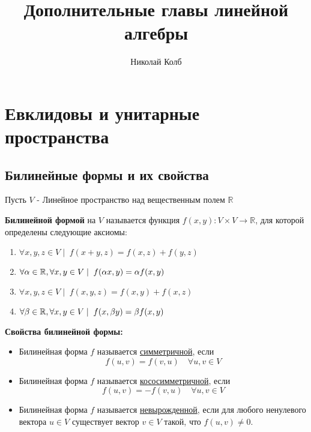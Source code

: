 \documentclass[12px]{report}
\title{Дополнительные главы линейной алгебры}
\author{Николай Колб}
\begin{document}
  \maketitle
  \tableofcontents

  \chapter{Евклидовы и унитарные пространства}

  \section{Билинейные формы и их свойства}

\large Пусть $V$ - Линейное пространство над вещественным полем $\mathbb{R}$

\vspace{0.5cm}


\begin{shdef}
    \begin{definition}
        \leavevmode\newline
        
        \textbf{Билинейной формой} на $V$ называется функция $f(x,y): V \times V \to \mathbb{R}$, для которой определены следующие аксиомы:
        \begin{enumerate}
            \item $\forall x,y,z \in V \mid \; f(x+y,z) = f(x, z) + f(y,z)$
            \item $\forall \alpha \in \mathbb{R}, \forall x,y \in V \mid \;  f(\alpha x, y) = \alpha f(x,y)$
            \item $\forall x, y, z \in V \mid \; f(x,y,z) = f(x,y) + f(x,z)$
            \item $\forall \beta \in \mathbb{R}, \forall x, y \in V \mid \; f(x, \beta y) = \beta f(x,y)$
        \end{enumerate}
    \end{definition}
\end{shdef}

\vspace{0.5cm}
\textbf{Свойства билинейной формы:}

\begin{itemize}
    \item Билинейная форма $f$ называется \underline{симметричной}, если
    \[
    f(u, v) = f(v, u) \quad \forall u, v \in V
    \]
    \item Билинейная форма $f$ называется \underline{кососимметричной}, если
    \[
    f(u, v) = -f(v, u) \quad \forall u, v \in V
    \]
    \item Билинейная форма $f$ называется \underline{невырожденной}, если для любого ненулевого вектора $u \in V$ существует вектор $v \in V$ такой, что $f(u, v) \neq 0$.
\end{itemize}
\end{document}

